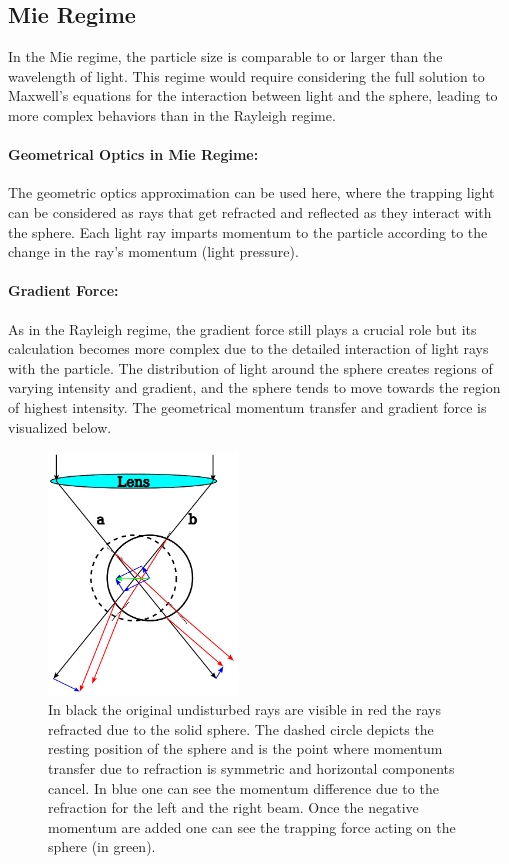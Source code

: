 \documentclass[12pt,english,ngerman]{scrartcl}
\begin{document}
\subsection{Mie Regime}

In the Mie regime, the particle size is comparable to or larger than the
wavelength of light. This regime would require considering the full solution to
Maxwell's equations for the interaction between light and the sphere, leading
to more complex behaviors than in the Rayleigh regime.

\paragraph{Geometrical Optics in Mie Regime:}
The geometric optics approximation can be used here, where the trapping light
can be considered as rays that get refracted and reflected as they interact
with the sphere. Each light ray imparts momentum to the particle according to
the change in the ray's momentum (light pressure).

\paragraph{Gradient Force:}
As in the Rayleigh regime, the gradient force still plays a crucial role but
its calculation becomes more complex due to the detailed interaction of light
rays with the particle. The distribution of light around the sphere creates
regions of varying intensity and gradient, and the sphere tends to move towards
the region of highest intensity. The geometrical momentum transfer and gradient
force is visualized below.\cite{bustamanteOpticalTweezersSinglemolecule2021}

\begin{figure}[H]
	\centering
	\includegraphics[width=0.45\textwidth]{figures/mieworkingprinciple.pdf}
	\caption[Working principle of optical tweezers in mie regime]{In black the original
		undisturbed rays are visible in red the rays refracted due to the solid sphere.
		The dashed circle depicts the resting position of the sphere and is the point
		where momentum transfer due to refraction is symmetric and horizontal
		components cancel. In blue one can see the momentum difference due to the
		refraction for the left and the right beam. Once the negative momentum are
		added one can see the trapping force acting on the sphere (in green).
	}\label{fig:mie_working_principle}
\end{figure}
\end{document}
